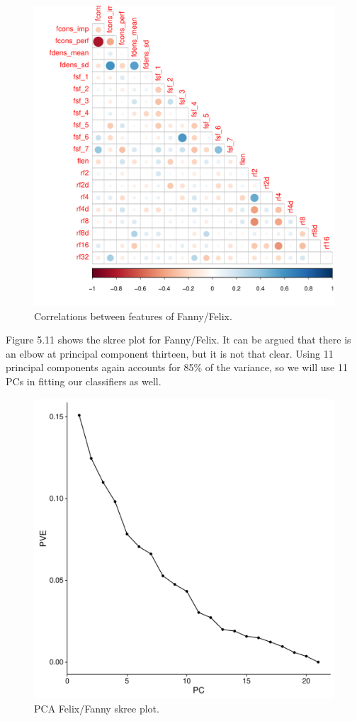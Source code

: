 \documentclass[12pt,twoside]{reedthesis}
\theoremstyle{definition}
\theoremstyle{definition}
\theoremstyle{definition}
\theoremstyle{remark}
\begin{document}
\begin{figure}[H]
\centering
\includegraphics[scale = .7]{images/cor_circles_f.pdf}
\caption{Correlations between features of Fanny/Felix.}
\label{subd}
\end{figure}
Figure 5.11 shows the skree plot for Fanny/Felix. It can be argued that
there is an elbow at principal component thirteen, but it is not that
clear. Using 11 principal components again accounts for 85\% of the
variance, so we will use 11 PCs in fitting our classifiers as well.
\begin{figure}[H]
\centering
\includegraphics[scale = .7]{images/skree_f.pdf}
\caption{PCA Felix/Fanny skree plot.}
\label{subd}
\end{figure}
\end{document}
